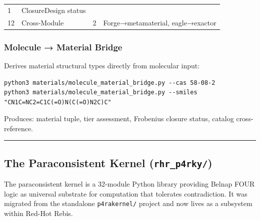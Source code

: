 \begin{longtable}[]{@{}llll@{}}
\begin{minipage}[t]{0.20\columnwidth}
1\strut
\end{minipage} & \begin{minipage}[t]{0.29\columnwidth}\raggedright
ClosureDesign status\strut
\end{minipage}\tabularnewline
\begin{minipage}[t]{0.09\columnwidth}\raggedright
12\strut
\end{minipage} & \begin{minipage}[t]{0.31\columnwidth}\raggedright
Cross-Module\strut
\end{minipage} & \begin{minipage}[t]{0.20\columnwidth}\raggedright
2\strut
\end{minipage} & \begin{minipage}[t]{0.29\columnwidth}\raggedright
Forge→metamaterial, eagle→exactor\strut
\end{minipage}\tabularnewline
\bottomrule
\end{longtable}

\hypertarget{molecule-material-bridge}{%
\subsubsection{Molecule → Material
Bridge}\label{molecule-material-bridge}}

Derives material structural types directly from molecular input:

\begin{verbatim}
python3 materials/molecule_material_bridge.py --cas 58-08-2
python3 materials/molecule_material_bridge.py --smiles "CN1C=NC2=C1C(=O)N(C(=O)N2C)C"
\end{verbatim}

Produces: material tuple, tier assessment, Frobenius closure status,
catalog cross-reference.

\begin{center}\rule{0.5\linewidth}{0.5pt}\end{center}

\hypertarget{the-paraconsistent-kernel-rhr_p4rky}{%
\subsection{\texorpdfstring{The Paraconsistent Kernel
(\texttt{rhr\_p4rky/})}{The Paraconsistent Kernel (rhr\_p4rky/)}}\label{the-paraconsistent-kernel-rhr_p4rky}}

The paraconsistent kernel is a 32-module Python library providing Belnap
FOUR logic as universal substrate for computation that tolerates
contradiction. It was migrated from the standalone \texttt{p4rakernel/}
project and now lives as a subsystem within Red-Hot Rebis.

